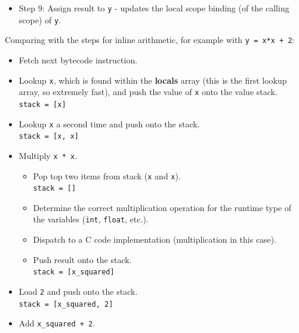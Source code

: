 \documentclass[10pt]{article}
\begin{document}
\begin{flushleft}
\begin{itemize}
        \begin{itemize}
            \item Produces a return value object if necessary.
            \item Removes the frame from the call stack.
            \item Restores calling frame back to the current frame.
            \item Pushes the return value onto the caller's evaluation stack.
        \end{itemize}
        \item Step 9: Assign result to \verb|y| - updates the local scope binding (of the calling scope) of \verb|y|.
    \end{itemize}
    Comparing with the steps for inline arithmetic, for example with \verb|y = x*x + 2|:
    \begin{itemize}
        \item Fetch next bytecode instruction.
        \item Lookup \verb|x|, which is found within the \textbf{locals} array (this is the first lookup array, so extremely fast), and push the value of \verb|x| onto the value stack.
        \\ \verb|stack = [x]|
        \item Lookup \verb|x| a second time and push onto the stack.
        \\ \verb|stack = [x, x]|
        \item Multiply \verb|x * x|.
        \begin{itemize}
            \item Pop top two items from stack (\verb|x| and \verb|x|).
            \\ \verb|stack = []|
            \item Determine the correct multiplication operation for the runtime type of the variables (\verb|int|, \verb|float|, etc.).
            \item Dispatch to a C code implementation (multiplication in this case).
            \item Push result onto the stack.
            \\ \verb|stack = [x_squared]|
        \end{itemize}
        \item Load \verb|2| and push onto the stack.
        \\ \verb|stack = [x_squared, 2]|
        \item Add \verb|x_squared + 2|.
        \begin{itemize}

\end{itemize}
\end{itemize}
\end{flushleft}
\end{document}

